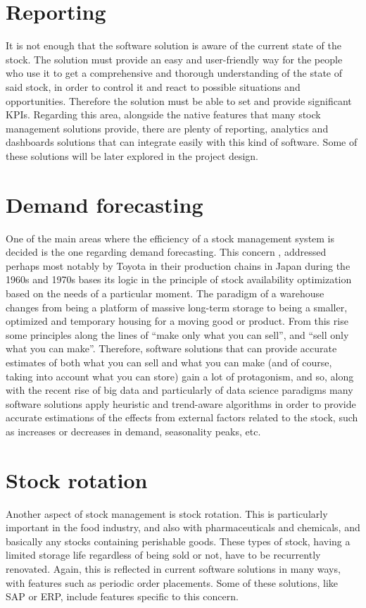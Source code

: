 \section{Reporting}
It is not enough that the software solution is aware of the current state of the stock. The solution must provide an easy and user-friendly way for the people who use it to get a comprehensive and thorough understanding of the state of said stock, in order to control it and react to possible situations and opportunities. Therefore the solution must be able to set and provide significant KPIs.
Regarding this area, alongside the native features that many stock management solutions provide, there are plenty of reporting, analytics and dashboards solutions that can integrate easily with this kind of software. Some of these solutions will be later explored in the project design.
\section{Demand forecasting}
One of the main areas where the efficiency of a stock management system is decided is the one regarding demand forecasting. This concern \cite{7}, addressed perhaps most notably by Toyota in their production chains in Japan during the 1960s and 1970s bases its logic in the principle of stock availability optimization based on the needs of a particular moment.
The paradigm of a warehouse changes from being a platform of massive long-term storage to being a smaller, optimized and temporary housing for a moving good or product. From this rise some principles along the lines of “make only what you can sell”, and “sell only what you can make”. Therefore, software solutions that can provide accurate estimates of both what you can sell and what you can make (and of course, taking into account what you can store) gain a lot of protagonism, and so, along with the recent rise of big data and particularly of data science paradigms many software solutions apply heuristic and trend-aware algorithms in order to provide accurate estimations of the effects from external factors related to the stock, such as increases or decreases in demand, seasonality peaks, etc.
\section{Stock rotation}
Another aspect of stock management is stock rotation. This is particularly important in the food industry, and also with pharmaceuticals and chemicals, and basically any stocks containing perishable goods. These types of stock, having a limited storage life regardless of being sold or not, have to be recurrently renovated. Again, this is reflected in current software solutions in many ways, with features such as periodic order placements. Some of these solutions, like SAP or ERP, include features specific to this concern.

